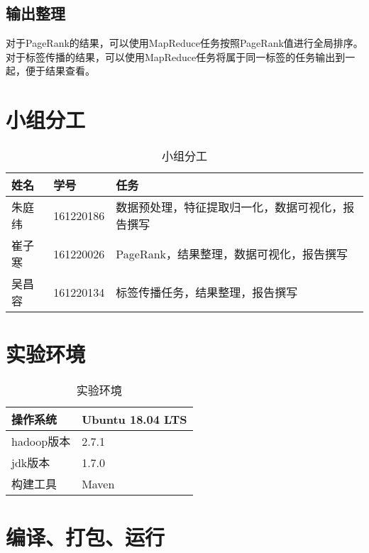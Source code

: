 \subsection{输出整理}
对于PageRank的结果，可以使用MapReduce任务按照PageRank值进行全局排序。\\
对于标签传播的结果，可以使用MapReduce任务将属于同一标签的任务输出到一起，便于结果查看。
\section{小组分工}
\begin{table}[!htbp]
	\centering
	\caption{小组分工}
	\begin{tabular} {|p{50pt}|p{80pt}|p{260pt}|}
		\hline
		姓名& 学号 &任务\\
		\hline
		朱庭纬&161220186&数据预处理，特征提取归一化，数据可视化，报告撰写\\
		\hline
		崔子寒&161220026&PageRank，结果整理，数据可视化，报告撰写\\
		\hline
		吴昌容&161220134&标签传播任务，结果整理，报告撰写\\
		\hline
	\end{tabular}
\end{table}
\section{实验环境}
\begin{table}[!htbp]
	\centering
	\caption{实验环境}
	\begin{tabular} {|p{80pt}|p{160pt}|}
		\hline
		操作系统&Ubuntu 18.04 LTS\\
		\hline
		hadoop版本& 2.7.1\\
		\hline
		jdk版本& 1.7.0\\
		\hline
		构建工具&Maven\\
		\hline
	\end{tabular}
\end{table}
\section{编译、打包、运行}

